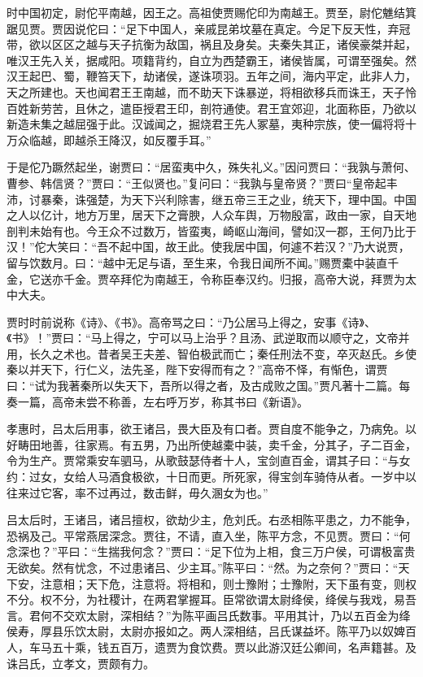 \documentclass[12pt,UTF8]{ctexbook}
\begin{document}
时中国初定，尉佗平南越，因王之。高祖使贾赐佗印为南越王。贾至，尉佗魋结箕踞见贾。贾因说佗曰：“足下中国人，亲戚昆弟坟墓在真定。今足下反天性，弃冠带，欲以区区之越与天子抗衡为敌国，祸且及身矣。夫秦失其正，诸侯豪桀并起，唯汉王先入关，据咸阳。项籍背约，自立为西楚霸王，诸侯皆属，可谓至强矣。然汉王起巴、蜀，鞭笞天下，劫诸侯，遂诛项羽。五年之间，海内平定，此非人力，天之所建也。天也闻君王王南越，而不助天下诛暴逆，将相欲移兵而诛王，天子怜百姓新劳苦，且休之，遣臣授君王印，剖符通使。君王宜郊迎，北面称臣，乃欲以新造未集之越屈强于此。汉诚闻之，掘烧君王先人冢墓，夷种宗族，使一偏将将十万众临越，即越杀王降汉，如反覆手耳。”



于是佗乃蹶然起坐，谢贾曰：“居蛮夷中久，殊失礼义。”因问贾曰：“我孰与萧何、曹参、韩信贤？”贾曰：“王似贤也。”复问曰：“我孰与皇帝贤？”贾曰“皇帝起丰沛，讨暴秦，诛强楚，为天下兴利除害，继五帝三王之业，统天下，理中国。中国之人以亿计，地方万里，居天下之膏腴，人众车舆，万物殷富，政由一家，自天地剖判未始有也。今王众不过数万，皆蛮夷，崎岖山海间，譬如汉一郡，王何乃比于汉！”佗大笑曰：“吾不起中国，故王此。使我居中国，何遽不若汉？”乃大说贾，留与饮数月。曰：“越中无足与语，至生来，令我日闻所不闻。”赐贾橐中装直千金，它送亦千金。贾卒拜佗为南越王，令称臣奉汉约。归报，高帝大说，拜贾为太中大夫。



贾时时前说称《诗》、《书》。高帝骂之曰：“乃公居马上得之，安事《诗》、《书》！”贾曰：“马上得之，宁可以马上治乎？且汤、武逆取而以顺守之，文帝并用，长久之术也。昔者吴王夫差、智伯极武而亡；秦任刑法不变，卒灭赵氏。乡使秦以并天下，行仁义，法先圣，陛下安得而有之？”高帝不怿，有惭色，谓贾曰：“试为我著秦所以失天下，吾所以得之者，及古成败之国。”贾凡著十二篇。每奏一篇，高帝未尝不称善，左右呼万岁，称其书曰《新语》。



孝惠时，吕太后用事，欲王诸吕，畏大臣及有口者。贾自度不能争之，乃病免。以好畴田地善，往家焉。有五男，乃出所使越橐中装，卖千金，分其子，子二百金，令为生产。贾常乘安车驷马，从歌鼓瑟侍者十人，宝剑直百金，谓其子曰：“与女约：过女，女给人马酒食极欲，十日而更。所死家，得宝剑车骑侍从者。一岁中以往来过它客，率不过再过，数击鲜，毋久溷女为也。”



吕太后时，王诸吕，诸吕擅权，欲劫少主，危刘氏。右丞相陈平患之，力不能争，恐祸及己。平常燕居深念。贾往，不请，直入坐，陈平方念，不见贾。贾曰：“何念深也？”平曰：“生揣我何念？”贾曰：“足下位为上相，食三万户侯，可谓极富贵无欲矣。然有忧念，不过患诸吕、少主耳。”陈平曰：“然。为之奈何？”贾曰：“天下安，注意相；天下危，注意将。将相和，则士豫附；士豫附，天下虽有变，则权不分。权不分，为社稷计，在两君掌握耳。臣常欲谓太尉绛侯，绛侯与我戏，易吾言。君何不交欢太尉，深相结？”为陈平画吕氏数事。平用其计，乃以五百金为绛侯寿，厚县乐饮太尉，太尉亦报如之。两人深相结，吕氏谋益坏。陈平乃以奴婢百人，车马五十乘，钱五百万，遗贾为食饮费。贾以此游汉廷公卿间，名声籍甚。及诛吕氏，立孝文，贾颇有力。
\end{document}
